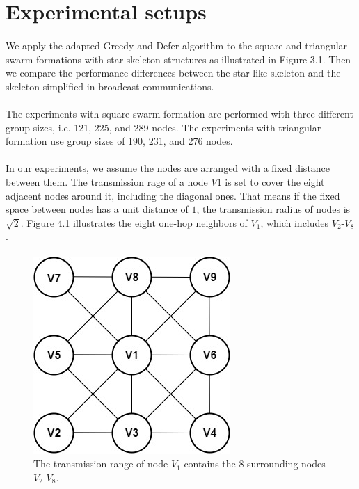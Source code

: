 \documentclass[a4paper,12pt]{report}
\begin{document}
\section{Experimental setups}
\paragraph{}We apply the adapted Greedy and Defer algorithm to the square and triangular swarm formations with star-skeleton structures as illustrated in Figure 3.1. Then we compare the performance differences between the star-like skeleton and the skeleton simplified in broadcast communications. 

\paragraph{}
The experiments with square swarm formation are performed with three different group sizes, i.e. 121, 225, and 289 nodes. The experiments with triangular formation use group sizes of 190, 231, and 276 nodes.

\paragraph{}
In our experiments, we assume the nodes are arranged with a fixed distance between them. The transmission rage of a node $V1$ is set to cover the eight adjacent nodes around it, including the diagonal ones. That means if the fixed space between nodes has a unit distance of $1$, the transmission radius of nodes is $\sqrt{2}$. Figure 4.1 illustrates the eight one-hop neighbors of $V_1$, which includes $V_2$-$V_8$. 

\paragraph{}
\begin{figure}
\begin{center}
\includegraphics[width=.35\linewidth]{images/range.jpg}
\caption{The transmission range of node $V_1$ contains the 8 surrounding nodes $V_2$-$V_8$.}
\end{center}
\end{figure}
\end{document}
